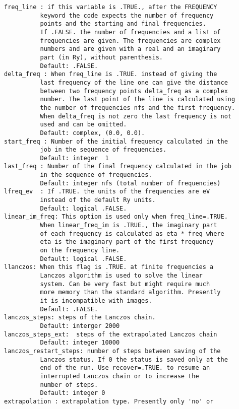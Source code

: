 \documentclass[12pt,a4paper,twoside]{report}
\begin{document}
\begin{verbatim}
freq_line : if this variable is .TRUE., after the FREQUENCY 
          keyword the code expects the number of frequency 
          points and the starting and final frequencies. 
          If .FALSE. the number of frequencies and a list of 
          frequencies are given. The frequencies are complex 
          numbers and are given with a real and an imaginary 
          part (in Ry), without parenthesis.
          Default: .FALSE.
delta_freq : When freq_line is .TRUE. instead of giving the 
          last frequency of the line one can give the distance 
          between two frequency points delta_freq as a complex 
          number. The last point of the line is calculated using 
          the number of frequencies nfs and the first frequency. 
          When delta_freq is not zero the last frequency is not 
          used and can be omitted.
          Default: complex, (0.0, 0.0).
start_freq : Number of the initial frequency calculated in the 
          job in the sequence of frequencies.
          Default: integer  1
last_freq : Number of the final frequency calculated in the job 
          in the sequence of frequencies.
          Default: integer nfs (total number of frequencies)
lfreq_ev  : If .TRUE. the units of the frequencies are eV 
          instead of the default Ry units.
          Default: logical .FALSE.
linear_im_freq: This option is used only when freq_line=.TRUE. 
          When linear_freq_im is .TRUE., the imaginary part 
          of each frequency is calculated as eta * freq where 
          eta is the imaginary part of the first frequency 
          on the frequency line.
          Default: logical .FALSE.
llanczos: When this flag is .TRUE. at finite frequencies a 
          Lanczos algorithm is used to solve the linear 
          system. Can be very fast but might require much 
          more memory than the standard algorithm. Presently 
          it is incompatible with images.
          Default: .FALSE.
lanczos_steps: steps of the Lanczos chain.
          Default: interger 2000
lanczos_steps_ext:  steps of the extrapolated Lanczos chain
          Default: integer 10000
lanczos_restart_steps: number of steps between saving of the 
          Lanczos status. If 0 the status is saved only at the 
          end of the run. Use recover=.TRUE. to resume an 
          interrupted Lanczos chain or to increase the 
          number of steps.
          Default: integer 0
extrapolation : extrapolation type. Presently only 'no' or 

\end{verbatim}
\end{document}
